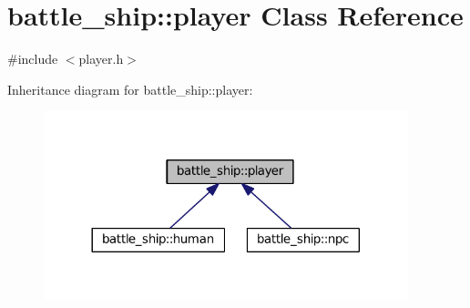 \hypertarget{classbattle__ship_1_1player}{}\section{battle\+\_\+ship\+:\+:player Class Reference}
\label{classbattle__ship_1_1player}


{\ttfamily \#include $<$player.\+h$>$}



Inheritance diagram for battle\+\_\+ship\+:\+:player\+:
\nopagebreak
\begin{figure}[H]
\begin{center}
\leavevmode
\includegraphics[width=300pt]{classbattle__ship_1_1player__inherit__graph}
\end{center}
\end{figure}
